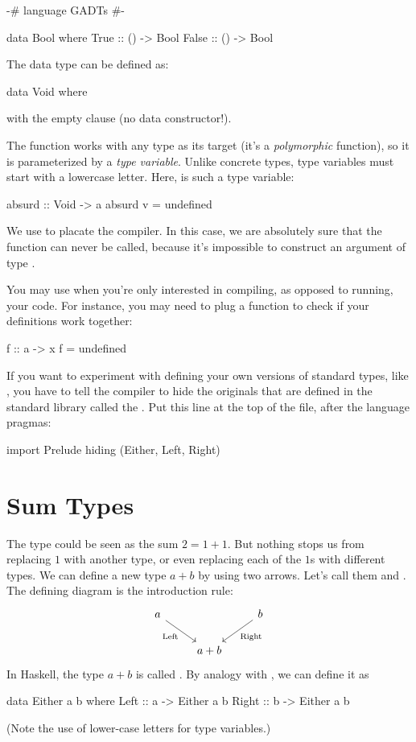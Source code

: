 \documentclass[DaoFP]{subfiles}
\begin{document}
\begin{haskell}
{-# language GADTs #-}

data Bool where
  True  :: () -> Bool
  False :: () -> Bool
\end{haskell}

The  data type can be defined as:
\begin{haskell}
data Void where
\end{haskell}
with the empty  clause (no data constructor!).

The function  works with any type as its target (it's a \emph{polymorphic} function), so it is parameterized by a \emph{type variable}. Unlike concrete types, type variables must start with a lowercase letter. Here,  is such a type variable:

\begin{haskell}
absurd :: Void -> a
absurd v = undefined
\end{haskell}
We use  to placate the compiler. In this case, we are absolutely sure that the function  can never be called, because it's impossible to construct an argument of type .

You may use  when you're only interested in compiling, as opposed to running, your code. For instance, you may need to plug a function  to check if your definitions work together:
\begin{haskell}
f :: a -> x
f = undefined
\end{haskell}

If you want to experiment with defining your own versions of standard types, like , you have to tell the compiler to hide the originals that are defined in the standard library called the . Put this line at the top of the file, after the language pragmas:
\begin{haskell}
import Prelude hiding (Either, Left, Right)
\end{haskell}


\section{Sum Types}

The  type could be seen as the sum $2 = 1 + 1$. But nothing stops us from replacing $1$ with another type, or even replacing each of the $1$s with different types. We can define a new type $a + b$ by using two arrows. Let's call them  and . The defining diagram is the introduction rule:
\[
 \begin{tikzcd}
 a
 \arrow[dr,  "\text{Left}"']
 && b
 \arrow[dl, "\text{Right}"]
 \\
&a + b
 \end{tikzcd}
\]
In Haskell, the type $a + b$ is called . By analogy with , we can define it as
\begin{haskell}
data Either a b where
  Left  :: a -> Either a b
  Right :: b -> Either a b
\end{haskell}
 (Note the use of lower-case letters for type variables.)
 
\end{document}
